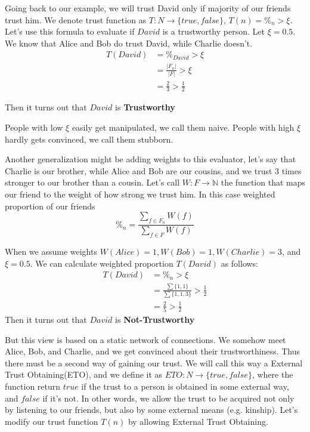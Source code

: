Going back to our example, we will trust David only if majority of our friends trust him. We denote trust function as $T : N \rightarrow \{true, false\}$, $T(n) = \%_n > \xi$. 
Let's use this formula to evaluate if $David$ is a trustworthy person. Let $\xi = 0.5$. We know that Alice and Bob do trust David, while Charlie doesn't.
\begin{align}
T(David) &= \%_{David} > \xi \\
&= \frac{|F_n|}{|F|} > \xi \\
&= \frac{2}{3} > \frac{1}{2}
\end{align}

Then it turns out that $David$ is \textbf{Trustworthy}


People with low $\xi$ easily get manipulated, we call them naive.
People with high $\xi$ hardly gets convinced, we call them stubborn. 

Another generalization might be adding weights to this evaluator, let's say that Charlie is our brother, while Alice and Bob are our cousins, and we trust 3 times stronger to our brother than a cousin. Let's call $W : F \rightarrow \mathbb{N}$ the function that maps our friend to the weight of how strong we trust him. In this case weighted proportion of our friends 
\begin{equation}
\%_n = \frac{\sum\limits_{f \in F_n} W(f)}{\sum\limits_{f \in F} W(f)}
\end{equation}

When we assume weights $W(Alice) = 1, W(Bob) = 1, W(Charlie) = 3$, and $\xi = 0.5$. We can calculate weighted proportion $T(David)$ as follows:
\begin{align}
T(David) &= \%_n > \xi \\
&= \frac{\sum \{1,1\}}{\sum\{1,1,3\}} > \frac{1}{2} \\
&= \frac{2}{5} > \frac{1}{2}
\end{align}
Then it turns out that $David$ is \textbf{Not-Trustworthy}

But this view is based on a static network of connections. We somehow meet Alice, Bob, and Charlie, and we get convinced about their trustworthiness. Thus there must be a second way of gaining our trust. We will call this way a External Trust Obtaining(ETO), and we define it as $ETO : N \rightarrow \{true,false\}$, where the function return $true$ if the trust to a person is obtained in some external way, and $false$ if it's not. In other words, we allow the trust to be acquired not only by listening to our friends, but also by some external means (e.g. kinship). Let's modify our trust function $T(n)$ by allowing External Trust Obtaining. 

